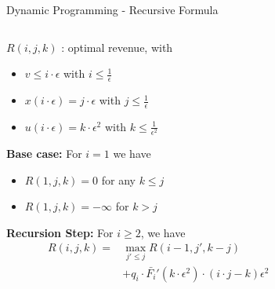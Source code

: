 \documentclass{beamer}
\begin{document}
\begin{frame}{Dynamic Programming - Recursive Formula}
  \begin{columns}
    \begin{column}{.6\textwidth}
      $R(i,j,k)$ : optimal revenue, with
      \begin{itemize}
        \item $v \leq i \cdot \epsilon$ with $i \leq \frac{1}{\epsilon}$
        \item $x(i \cdot \epsilon) = j \cdot \epsilon$ with $j \leq \frac{1}{\epsilon}$
        \item $u(i \cdot \epsilon) = k \cdot \epsilon^2$ with $k \leq \frac{1}{\epsilon^2}$
      \end{itemize}

      \textbf{Base case:}
      For $i = 1$ we have
      \begin{itemize}
        \item $R(1,j,k) = 0$ for any $k \leq j$
        \item $R(1,j,k) = -\infty$ for $k > j$
      \end{itemize}

      \textbf{Recursion Step:}
      For $i \geq 2$, we have
      \begin{align*}
        R(i,j,k) = & \max_{j' \leq j} R(i-1, j', k-j) \\ &+ q_i \cdot \bar{F_i}'(k \cdot \epsilon^2)\cdot (i \cdot j - k)\epsilon^2
      \end{align*}
    \end{column}
    \begin{column}{.4\textwidth}
      \begin{center}
\end{center}
\end{column}
\end{columns}
\end{frame}
\end{document}
